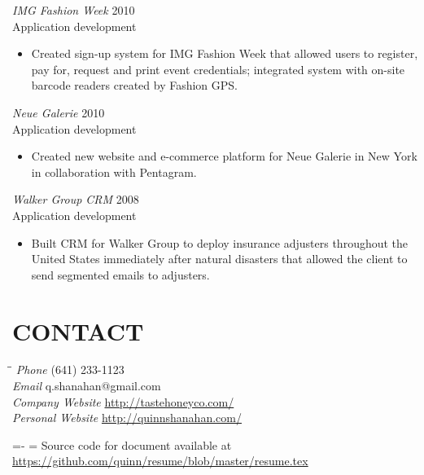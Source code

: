 \documentclass[line,margin]{res}
\begin{document}
\begin{resume}
    {\sl IMG Fashion Week}
    \hfill 2010 \\
    Application development
    \begin{itemize} \itemsep -2pt
        \item
            Created sign-up system for IMG Fashion Week that allowed users to register,
            pay for, request and print event credentials; integrated system with on-site
            barcode readers created by Fashion GPS.
    \end{itemize}

    {\sl Neue Galerie}
    \hfill 2010 \\
    Application development
    \begin{itemize} \itemsep -2pt
        \item
            Created new website and e-commerce platform for Neue Galerie in New York
            in collaboration with Pentagram.
    \end{itemize}

    \begin{samepage}
    {\sl Walker Group CRM}
    \hfill 2008 \\
    Application development
    \begin{itemize} \itemsep -2pt
        \item
            Built CRM for Walker Group to deploy insurance adjusters throughout the United
            States immediately after natural disasters that allowed the client to send segmented
            emails to adjusters.
    \end{itemize}
    \end{samepage}

\section{CONTACT}
    \vspace{-2.3ex}
    \begin{tabbing}
    \hspace{1.5in}\= \hspace{2.0in}\= \kill
    {\sl Phone}
        \> (641) 233-1123 \\
    {\sl Email}
        \> q.shanahan@gmail.com \\
    {\sl Company Website}
        \> \url{http://tastehoneyco.com/} \\
    {\sl Personal Website}
        \> \url{http://quinnshanahan.com/} \\
    \end{tabbing}

\vfill
\leftskip=-\hoffset
\advance\textwidth\hoffset
\hsize=\textwidth
\fullline
\vskip 2pt
Source code for document available at \url{https://github.com/quinn/resume/blob/master/resume.tex}

\end{resume}
\end{document}
